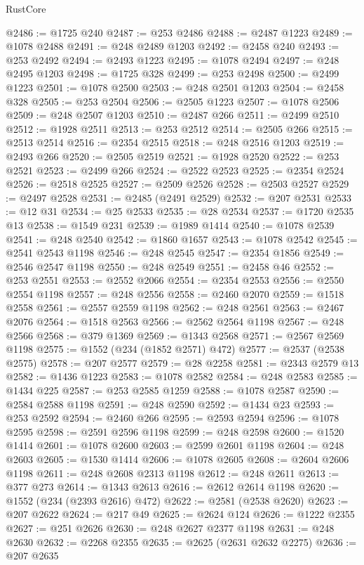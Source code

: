 \begin{lexlean}{RustCore}
\begin{coremodule}
@2486 := @1725 @240
@2487 := @253 @2486
@2488 := @2487 @1223
@2489 := @1078 @2488
@2491 := @248 @2489 @1203
@2492 := @2458 @240
@2493 := @253 @2492
@2494 := @2493 @1223
@2495 := @1078 @2494
@2497 := @248 @2495 @1203
@2498 := @1725 @328
@2499 := @253 @2498
@2500 := @2499 @1223
@2501 := @1078 @2500
@2503 := @248 @2501 @1203
@2504 := @2458 @328
@2505 := @253 @2504
@2506 := @2505 @1223
@2507 := @1078 @2506
@2509 := @248 @2507 @1203
@2510 := @2487 @266
@2511 := @2499 @2510
@2512 := @1928 @2511
@2513 := @253 @2512
@2514 := @2505 @266
@2515 := @2513 @2514
@2516 := @2354 @2515
@2518 := @248 @2516 @1203
@2519 := @2493 @266
@2520 := @2505 @2519
@2521 := @1928 @2520
@2522 := @253 @2521
@2523 := @2499 @266
@2524 := @2522 @2523
@2525 := @2354 @2524
@2526 := @2518 @2525
@2527 := @2509 @2526
@2528 := @2503 @2527
@2529 := @2497 @2528
@2531 := @2485 (@2491 @2529)
@2532 := @207 @2531
@2533 := @12 @31
@2534 := @25 @2533
@2535 := @28 @2534
@2537 := @1720 @2535 @13
@2538 := @1549 @231
@2539 := @1989 @1414
@2540 := @1078 @2539
@2541 := @248 @2540
@2542 := @1860 @1657
@2543 := @1078 @2542
@2545 := @2541 @2543 @1198
@2546 := @248 @2545
@2547 := @2354 @1856
@2549 := @2546 @2547 @1198
@2550 := @248 @2549
@2551 := @2458 @46
@2552 := @253 @2551
@2553 := @2552 @2066
@2554 := @2354 @2553
@2556 := @2550 @2554 @1198
@2557 := @248 @2556
@2558 := @2460 @2070
@2559 := @1518 @2558
@2561 := @2557 @2559 @1198
@2562 := @248 @2561
@2563 := @2467 @2076
@2564 := @1518 @2563
@2566 := @2562 @2564 @1198
@2567 := @248 @2566
@2568 := @379 @1369
@2569 := @1343 @2568
@2571 := @2567 @2569 @1198
@2575 := @1552 (@234 (@1852 @2571) @472)
@2577 := @2537 (@2538 @2575)
@2578 := @207 @2577
@2579 := @28 @2258
@2581 := @2343 @2579 @13
@2582 := @1436 @1223
@2583 := @1078 @2582
@2584 := @248 @2583
@2585 := @1434 @225
@2587 := @253 @2585 @1259
@2588 := @1078 @2587
@2590 := @2584 @2588 @1198
@2591 := @248 @2590
@2592 := @1434 @23
@2593 := @253 @2592
@2594 := @2460 @266
@2595 := @2593 @2594
@2596 := @1078 @2595
@2598 := @2591 @2596 @1198
@2599 := @248 @2598
@2600 := @1520 @1414
@2601 := @1078 @2600
@2603 := @2599 @2601 @1198
@2604 := @248 @2603
@2605 := @1530 @1414
@2606 := @1078 @2605
@2608 := @2604 @2606 @1198
@2611 := @248 @2608 @2313 @1198
@2612 := @248 @2611
@2613 := @377 @273
@2614 := @1343 @2613
@2616 := @2612 @2614 @1198
@2620 := @1552 (@234 (@2393 @2616) @472)
@2622 := @2581 (@2538 @2620)
@2623 := @207 @2622
@2624 := @217 @49
@2625 := @2624 @124
@2626 := @1222 @2355
@2627 := @251 @2626
@2630 := @248 @2627 @2377 @1198
@2631 := @248 @2630
@2632 := @2268 @2355
@2635 := @2625 (@2631 @2632 @2275)
@2636 := @207 @2635

\end{coremodule}
\end{lexlean}
